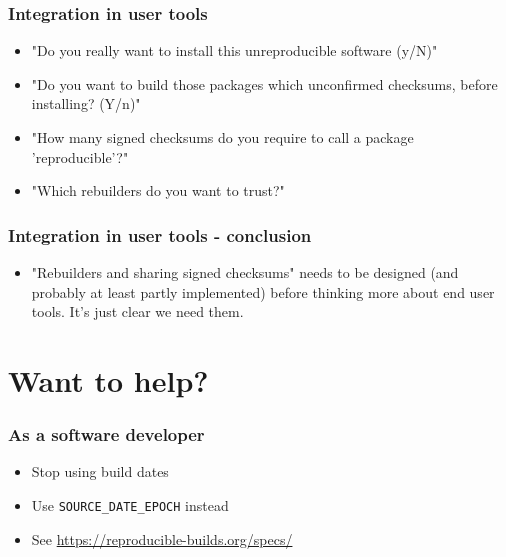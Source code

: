 \documentclass[14pt]{beamer}
\begin{document}
\begin{frame}
 \frametitle{Integration in user tools}
 \begin{itemize}
  \item "Do you really want to install this unreproducible software (y/N)"
  \item<2-4> "Do you want to build those packages which unconfirmed checksums,
  before installing? (Y/n)"
  \item<3-4>{ "How many signed checksums do you require to call a package
  'reproducible'?"}
  \item<4>{ "Which rebuilders do you want to trust?"}
 \end{itemize}
\end{frame}

\begin{frame}
 \frametitle{Integration in user tools - conclusion}
 \begin{itemize}
  \item "Rebuilders and sharing signed checksums" needs to be designed
  (and probably at least partly implemented) before thinking more about end
  user tools. It's just clear we need them. 
 \end{itemize}
\end{frame}

\section{Want to help?}

\begin{frame}
 \frametitle{As a software developer}
 \begin{itemize}
  \item Stop using build dates
  \item Use \texttt{SOURCE\_DATE\_EPOCH} instead
  \item See \url{https://reproducible-builds.org/specs/}
 \end{itemize}
\end{frame}
\end{document}
